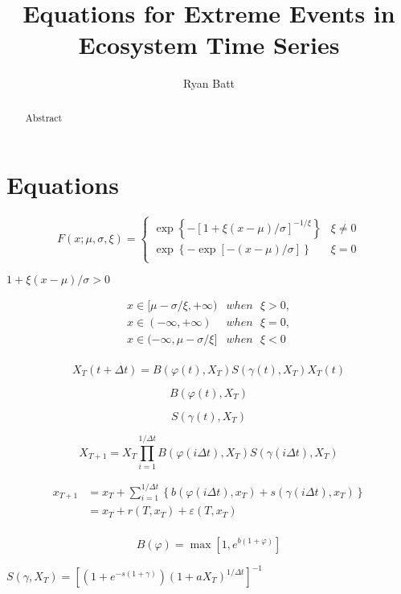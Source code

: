 \documentclass{article}
\title{Equations for Extreme Events in Ecosystem Time Series}
\author{Ryan Batt}
\begin{document}
\maketitle

\begin{abstract}
    Abstract
\end{abstract}

\section{Equations}

\[F\left( x;\mu ,\sigma ,\xi  \right)=\left\{ \begin{matrix}
   \exp \left\{ -{{[1+\xi (x-\mu )/\sigma ]}^{-1/\xi }} \right\} & \xi \ne 0  \\
   \exp \left\{ -\exp \left[ -(x-\mu )/\sigma  \right] \right\} & \xi =0  \\
\end{matrix} \right.\]

$1+\xi (x-\mu )/\sigma >0$

\[\begin{array}{*{35}{l}}
   x\in [\mu -\sigma /\xi ,+\infty ) & when\text{ }\xi >0,  \\
   x\in (-\infty ,+\infty ) & when\text{ }\xi =0,  \\
   x\in (-\infty ,\mu -\sigma /\xi ] & when\text{ }\xi <0  \\
\end{array}\]

\[{{X}_{T}}\left( t+\Delta t \right)=B\left( \varphi \left( t \right),{{X}_{T}} \right)S\left( \gamma \left( t \right),{{X}_{T}} \right){{X}_{T}}\left( t \right)\]

\[B\left( \varphi \left( t \right),{{X}_{T}} \right)\]

\[S\left( \gamma \left( t \right),{{X}_{T}} \right)\]

\[{{X}_{T+1}}={{X}_{T}}\prod\limits_{i=1}^{1/\Delta t}{B\left( \varphi \left( i\Delta t \right),{{X}_{T}} \right)S\left( \gamma \left( i\Delta t \right),{{X}_{T}} \right)}\]

\[\begin{array}{*{35}{l}}
   {{x}_{T+1}} & ={{x}_{T}}+\sum\limits_{i=1}^{1/\Delta t}{\left\{ b\left( \varphi \left( i\Delta t \right),{{x}_{T}} \right)+s\left( \gamma \left( i\Delta t \right),{{x}_{T}} \right) \right\}}  \\
   {} & ={{x}_{T}}+r\left( T,{{x}_{T}} \right)+\varepsilon \left( T,{{x}_{T}} \right)  \\
\end{array}\]

\[B\left( \varphi  \right)=\max \left[ 1,{{e}^{b\left( 1+\varphi  \right)}} \right]\]

$S\left( \gamma ,{{X}_{T}} \right)={{\left[ \left( 1+{{e}^{-s\left( 1+\gamma  \right)}} \right){{\left( 1+a{{X}_{T}} \right)}^{1/\Delta t}} \right]}^{-1}}$
\end{document}
